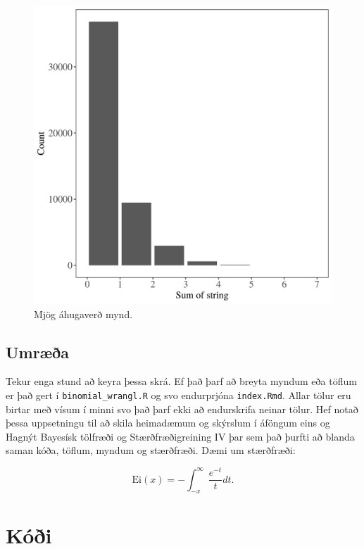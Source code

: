 \documentclass[10pt,]{article}
\begin{document}
\begin{figure}[H]

{\centering \includegraphics[width=1\linewidth]{img/sum_bp} 

}

\caption{Mjög áhugaverð mynd.}\label{fig:sumplt}
\end{figure}

\hypertarget{umruxe6uxf0a}{%
\subsection{Umræða}\label{umruxe6uxf0a}}

Tekur enga stund að keyra þessa skrá. Ef það þarf að breyta myndum eða töflum er það gert í \texttt{binomial\_wrangl.R} og svo endurprjóna \texttt{index.Rmd}. Allar tölur eru birtar með vísum í minni svo það þarf ekki að endurskrifa neinar tölur. Hef notað þessa uppsetningu til að skila heimadæmum og skýrslum í áföngum eins og Hagnýt Bayesísk tölfræði og Stærðfræðigreining IV þar sem það þurfti að blanda saman kóða, töflum, myndum og stærðfræði. Dæmi um stærðfræði:

\[
\mbox{Ei}(x) = -\int _{-x} ^{\infty} \frac{e^{-t}}{t} dt.
\]

\newpage

\hypertarget{kuxf3uxf0i}{%
\section{Kóði}\label{kuxf3uxf0i}}
\end{document}
